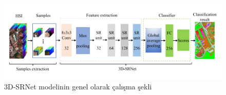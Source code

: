 \begin{figure}[!ht]
  \centering
  \includegraphics[width=1\textwidth]{Figures/3Dsrnet18.png}
  \caption{3D-SRNet modelinin genel olarak çalışma şekli }
\end{figure}















